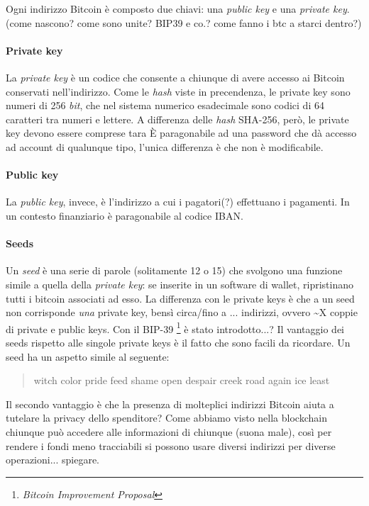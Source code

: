\documentclass {article}
\begin{document}
Ogni indirizzo Bitcoin è composto due chiavi: una \textit{public key} e una \textit{private key}. (come nascono? come sono unite? BIP39 e co.? come fanno i btc a starci dentro?)


\paragraph {Private key}


La \textit{private key} è un codice che consente a chiunque di avere accesso ai Bitcoin conservati nell'indirizzo.
Come le \textit{hash} viste in precendenza, le private key sono numeri di 256 \textit{bit}, che nel sistema numerico esadecimale sono codici di 64 caratteri tra numeri e lettere.
A differenza delle \textit{hash} SHA-256, però, le private key devono essere comprese tara 
È paragonabile ad una password che dà accesso ad account di qualunque tipo, l'unica differenza è che non è modificabile.


\paragraph {Public key}


La \textit{public key}, invece, è l'indirizzo a cui i pagatori(?) effettuano i pagamenti.
In un contesto finanziario è paragonabile al codice IBAN.


\paragraph {Seeds}


Un \textit{seed} è una serie di parole (solitamente 12 o 15) che svolgono una funzione simile a quella della \textit{private key}: se inserite in un software di wallet, ripristinano tutti i bitcoin associati ad esso.
La differenza con le private keys è che a un seed non corrisponde \emph{una} private key, bensì circa/fino a ... indirizzi, ovvero \textasciitilde X coppie di private e public keys.
Con il BIP-39 \footnote{\textit{Bitcoin Improvement Proposal}} è stato introdotto...?
Il vantaggio dei seeds rispetto alle singole private keys è il fatto che sono facili da ricordare. Un seed ha un aspetto simile al seguente:

\begin{quote}

witch color pride feed shame open despair creek road again ice least

\end{quote}
%
Il secondo vantaggio è che la presenza di molteplici indirizzi Bitcoin aiuta a tutelare la privacy dello spenditore?
Come abbiamo visto nella blockchain chiunque può accedere alle informazioni di chiunque (suona male), così per rendere i fondi meno tracciabili si possono usare diversi indirizzi per diverse operazioni... spiegare.
\end{document}
